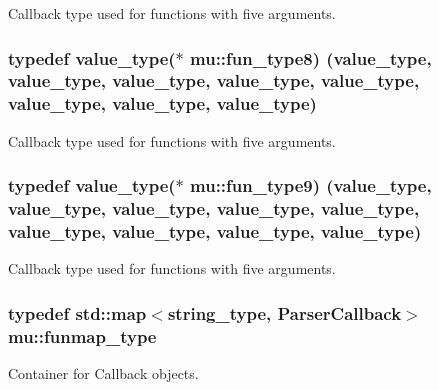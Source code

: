 Callback type used for functions with five arguments. 

\subsubsection[{\texorpdfstring{fun\+\_\+type8}{fun_type8}}]{\setlength{\rightskip}{0pt plus 5cm}typedef {\bf value\+\_\+type}($\ast$ mu\+::fun\+\_\+type8) ({\bf value\+\_\+type}, {\bf value\+\_\+type}, {\bf value\+\_\+type}, {\bf value\+\_\+type}, {\bf value\+\_\+type}, {\bf value\+\_\+type}, {\bf value\+\_\+type}, {\bf value\+\_\+type})}\hypertarget{namespacemu_a17cfcdc39e8d1d95c1418e117eb923b8}{}\label{namespacemu_a17cfcdc39e8d1d95c1418e117eb923b8}


Callback type used for functions with five arguments. 

\subsubsection[{\texorpdfstring{fun\+\_\+type9}{fun_type9}}]{\setlength{\rightskip}{0pt plus 5cm}typedef {\bf value\+\_\+type}($\ast$ mu\+::fun\+\_\+type9) ({\bf value\+\_\+type}, {\bf value\+\_\+type}, {\bf value\+\_\+type}, {\bf value\+\_\+type}, {\bf value\+\_\+type}, {\bf value\+\_\+type}, {\bf value\+\_\+type}, {\bf value\+\_\+type}, {\bf value\+\_\+type})}\hypertarget{namespacemu_a04c92810aa2e6098af69f47474388d71}{}\label{namespacemu_a04c92810aa2e6098af69f47474388d71}


Callback type used for functions with five arguments. 

\subsubsection[{\texorpdfstring{funmap\+\_\+type}{funmap_type}}]{\setlength{\rightskip}{0pt plus 5cm}typedef std\+::map$<${\bf string\+\_\+type}, {\bf Parser\+Callback}$>$ {\bf mu\+::funmap\+\_\+type}}\hypertarget{namespacemu_aa38fb627ca71e44a49de0f2fe4d9031d}{}\label{namespacemu_aa38fb627ca71e44a49de0f2fe4d9031d}


Container for Callback objects. 

